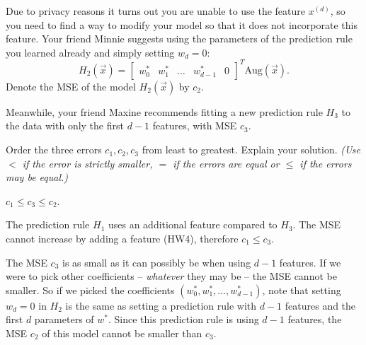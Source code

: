 \documentclass[twoside,12pt]{article}
\newcommand{\avocado}{%
  \begingroup\normalfont
  \texttt{[image: pics/avo.png]}%
  \endgroup
}
\newcommand{\avo}[1]{\multido{}{#1}{\avocado}\hspace{0.2em}}
\begin{document}
\begin{probset}
\begin{prob}[({10} points)]
\begin{subprobset}
    \begin{subprob}\avo{6}
        Due to privacy reasons it turns out you are unable to use the feature $x^{(d)}$, so you need to find a way to modify your model so that it does not incorporate this feature. Your friend Minnie suggests using the parameters of the prediction rule you learned already and simply setting $w_d=0$:
            \[
                H_2(\vec{x}) = \begin{bmatrix}
                    w_0^* & w_1^* & \ldots & w_{d-1}^* & 0
                \end{bmatrix}^T \text{Aug}(\vec{x}).
            \]
        Denote the MSE of the model $H_2(\vec{x})$ by $c_2$.
        
        \vspace*{.125in}
        
        Meanwhile, your friend Maxine recommends fitting a new prediction rule $H_3$ to the data with only the first $d-1$ features, with MSE $c_3$. 
        
        Order the three errors $c_1, c_2, c_3$ from least to greatest. Explain your solution. \textit{(Use $<$ if the error is strictly smaller, $=$ if the errors are equal or $\leq$ if the errors may be equal.)}
    \end{subprob}
    
    \begin{soln}
    $c_1 \leq c_3 \leq c_2$.
    
    The prediction rule $H_1$ uses an additional feature compared to $H_3$. The MSE cannot increase by adding a feature (HW4), therefore $c_1 \leq c_3$.
    
    The MSE $c_3$ is as small as it can possibly be when using $d-1$ features. 
    If we were to pick other coefficients -- \emph{whatever} they may be -- the MSE cannot be smaller. So if we picked the coefficients $(w^*_0, w^*_1, \ldots, w^*_{d-1})$, note that setting $w_d=0$ in $H_2$ is the same as setting a prediction rule with $d-1$ features and the first $d$ parameters of $w^*$. Since this prediction rule is using $d-1$ features, 
    the MSE $c_2$ of this model cannot be smaller than $c_3$.
    
    \end{soln}

            \begin{responsebox}{2in}
                
            \end{responsebox}



\end{subprobset}
\end{prob}
\end{probset}
\end{document}
